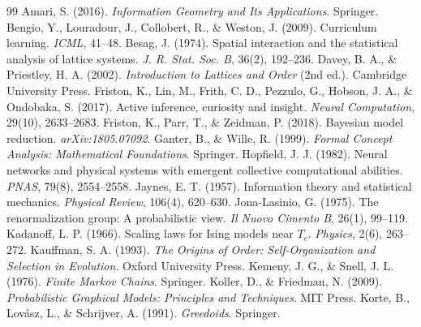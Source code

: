 \documentclass[11pt]{article}
\theoremstyle{definition}
\theoremstyle{plain}
\begin{document}
\begin{thebibliography}{99}\footnotesize\setlength{\itemsep}{0.5pt}\setlength{\parskip}{0pt}
 Amari, S. (2016). \emph{Information Geometry and Its Applications}. Springer.
 Bengio, Y., Louradour, J., Collobert, R., \& Weston, J. (2009). Curriculum learning. \emph{ICML}, 41--48.
 Besag, J. (1974). Spatial interaction and the statistical analysis of lattice systems. \emph{J. R. Stat. Soc. B}, 36(2), 192--236.
 Davey, B. A., \& Priestley, H. A. (2002). \emph{Introduction to Lattices and Order} (2nd ed.). Cambridge University Press.
 Friston, K., Lin, M., Frith, C. D., Pezzulo, G., Hobson, J. A., \& Ondobaka, S. (2017). Active inference, curiosity and insight. \emph{Neural Computation}, 29(10), 2633--2683.
 Friston, K., Parr, T., \& Zeidman, P. (2018). Bayesian model reduction. \emph{arXiv:1805.07092}.
 Ganter, B., \& Wille, R. (1999). \emph{Formal Concept Analysis: Mathematical Foundations}. Springer.
 Hopfield, J. J. (1982). Neural networks and physical systems with emergent collective computational abilities. \emph{PNAS}, 79(8), 2554--2558.
 Jaynes, E. T. (1957). Information theory and statistical mechanics. \emph{Physical Review}, 106(4), 620--630.
 Jona-Lasinio, G. (1975). The renormalization group: A probabilistic view. \emph{Il Nuovo Cimento B}, 26(1), 99--119.
 Kadanoff, L. P. (1966). Scaling laws for Ising models near $T_c$. \emph{Physics}, 2(6), 263--272.
 Kauffman, S. A. (1993). \emph{The Origins of Order: Self-Organization and Selection in Evolution}. Oxford University Press.
 Kemeny, J. G., \& Snell, J. L. (1976). \emph{Finite Markov Chains}. Springer.
 Koller, D., \& Friedman, N. (2009). \emph{Probabilistic Graphical Models: Principles and Techniques}. MIT Press.
 Korte, B., Lov\'asz, L., \& Schrijver, A. (1991). \emph{Greedoids}. Springer.

\end{thebibliography}
\end{document}
